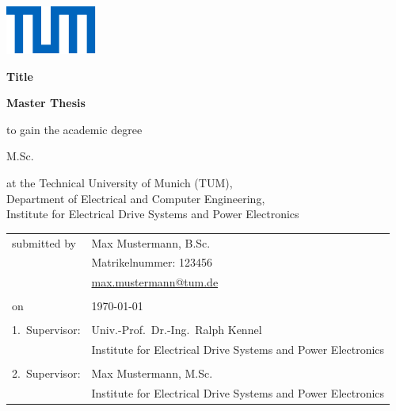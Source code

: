 \documentclass[journal]{IEEEtran}
\begin{document}
{	%
	\begin{titlepage}
		\areaset{17cm}{25.7cm}%
		\hfill\includegraphics{Images/TUM.pdf}\par%
		\vspace{3cm}%
		{\noindent\Huge\bfseries\sffamily Title\par}
		\vspace{0.5cm}%
		{\noindent\LARGE\bfseries\sffamily Master Thesis\par}
		\vfill%
		{\noindent\Large to gain the academic degree\par
		\vspace{1em}
		\noindent M.Sc.\par
		\vspace{1em}
		\noindent at the Technical University of Munich (TUM),\\ Department of Electrical and Computer Engineering,\\ Institute for Electrical Drive Systems and Power Electronics\par
		\vspace{3cm}%
		\noindent%
		\begin{tabular}{ll}
					submitted by
				&
					Max Mustermann, B.Sc.
					\\&
					Matrikelnummer: 123456
					\\&
					\url{max.mustermann@tum.de}
					
			\\
				\hfill
			\\
					on
				&
					\today	
			\\
				\hfill
			\\
					1.\ Supervisor:
				&
					Univ.-Prof.\ Dr.-Ing.\ Ralph Kennel
					\\&
					Institute for Electrical Drive Systems and Power Electronics
					
			\\
				\hfill
			\\
					2.\ Supervisor:
				&
					Max Mustermann, M.Sc.
					\\&
					Institute for Electrical Drive Systems and Power Electronics
		\end{tabular}%
		}%
	\end{titlepage}
}{}
\end{document}
